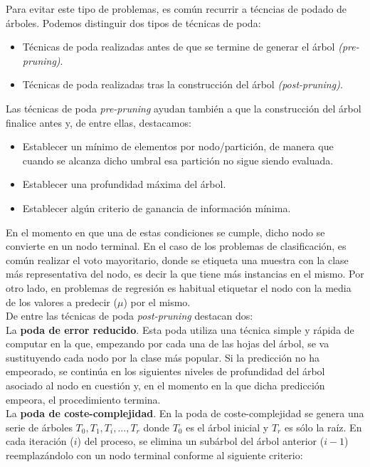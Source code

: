 Para evitar este tipo de problemas, es común recurrir a técncias de podado de árboles. Podemos distinguir dos tipos de técnicas de poda:

\begin{itemize}
	\item Técnicas de poda realizadas antes de que se termine de generar el árbol \textit{(pre-pruning)}.
	\item Técnicas de poda realizadas tras la construcción del árbol \textit{(post-pruning)}.
\end{itemize}

Las técnicas de poda \textit{pre-pruning} ayudan también a que la construcción del árbol finalice antes y, de entre ellas, destacamos:

\begin{itemize}
	\item Establecer un mínimo de elementos por nodo/partición, de manera que cuando se alcanza dicho umbral esa partición no sigue siendo evaluada.
	\item Establecer una profundidad máxima del árbol.
	\item Establecer algún criterio de ganancia de información mínima.
\end{itemize}

En el momento en que una de estas condiciones se cumple, dicho nodo se convierte en un nodo terminal. En el caso de los problemas de clasificación, es común realizar el voto mayoritario, donde se etiqueta una muestra con la clase más representativa del nodo, es decir la que tiene más instancias en el mismo. Por otro lado, en problemas de regresión es habitual etiquetar el nodo con la media de los valores a predecir ($\mu$) por el mismo.\\

De entre las técnicas de poda \textit{post-pruning} destacan dos:\\

La \textbf{poda de error reducido}. Esta poda utiliza una técnica simple y rápida de computar en la que, empezando por cada una de las hojas del árbol, se va sustituyendo cada nodo por la clase más popular. Si la predicción no ha empeorado, se continúa en los siguientes niveles de profundidad del árbol asociado al nodo en cuestión y, en el momento en la que dicha predicción empeora, el procedimiento termina.\\

La \textbf{poda de coste-complejidad}. En la poda de coste-complejidad se genera una serie de árboles $T_0, T_1, T_i, ... , T_r$ donde $T_0$ es el árbol inicial y $T_r$ es sólo la raíz. En cada iteración ($i$) del proceso, se elimina un subárbol del árbol anterior ($i-1$) reemplazándolo con un nodo terminal conforme al siguiente criterio:

